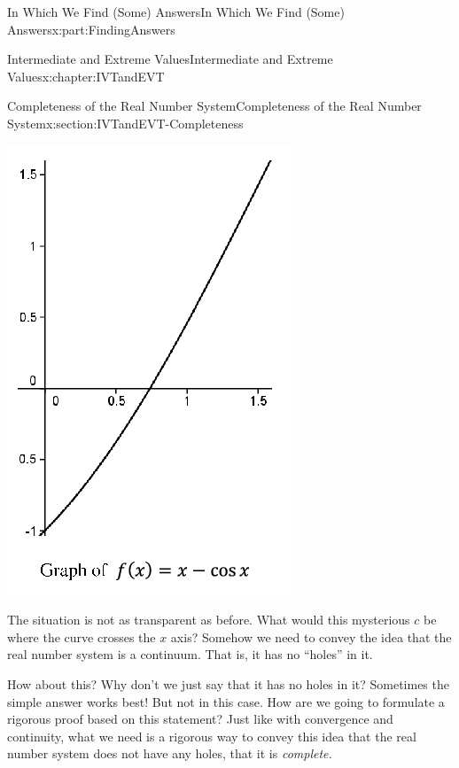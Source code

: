 \documentclass[oneside,10pt,]{book}
\numberwithin{equation}{section}
\begin{document}
\begin{partptx}{In Which We Find (Some) Answers}{}{In Which We Find (Some) Answers}{}{}{x:part:FindingAnswers}
\begin{chapterptx}{Intermediate and Extreme Values}{}{Intermediate and Extreme Values}{}{}{x:chapter:IVTandEVT}
\begin{sectionptx}{Completeness of the Real Number System}{}{Completeness of the Real Number System}{}{}{x:section:IVTandEVT-Completeness}
\begin{image}{0.315}{0.37}{0.315}
\includegraphics[width=\linewidth]{images/Ch6fig2.png}
\end{image}%
The situation is not as transparent as before. What would this mysterious \(c\) be where the curve crosses the \(x\) axis? Somehow we need to convey the idea that the real number system is a continuum. That is, it has no ``holes'' in it.%
\par
How about this? Why don't we just say that it has no holes in it? Sometimes the simple answer works best! But not in this case. How are we going to formulate a rigorous proof based on this statement? Just like with convergence and continuity, what we need is a rigorous way to convey this idea that the real number system does not have any holes, that it is \emph{complete.}%

\end{sectionptx}
\end{chapterptx}
\end{partptx}
\end{document}
